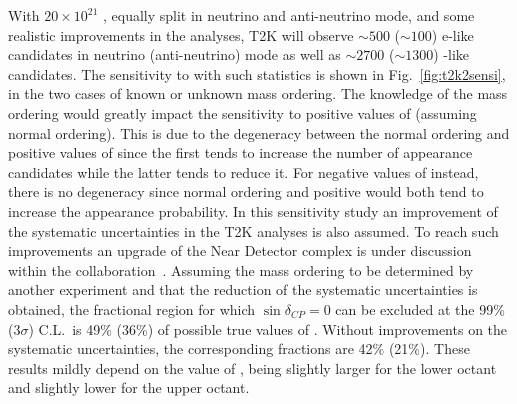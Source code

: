 With $20\times10^{21}$ \pot, equally split in neutrino and anti-neutrino mode, and some realistic improvements in the analyses, T2K will observe $\sim500$ ($\sim100$) e-like candidates in neutrino (anti-neutrino) mode as well as $\sim2700$ ($\sim1300$) \mmu-like candidates. The sensitivity to \dcp with such statistics is shown in Fig.~\ref{fig:t2k2sensi}, in the two cases of known or unknown mass ordering. The knowledge of the mass ordering would greatly impact the sensitivity to positive values of \dcp (assuming normal ordering). This is due to the degeneracy between the normal ordering and positive values of \dcp since the first tends to increase the number of \nue appearance candidates while the latter tends to reduce it. For negative values of \dcp instead, there is no degeneracy since normal ordering and positive \dcp would both tend to increase the \nue appearance probability. In this sensitivity study an improvement of the systematic uncertainties in the T2K analyses is also assumed. To reach such improvements an upgrade of the Near Detector complex is under discussion within the collaboration~\cite{ndupgrade}. Assuming the mass ordering to be determined by another experiment and that the reduction of the systematic uncertainties is obtained, the fractional region for which \(\sin\delta_{CP}=0\) can be excluded at the 99\% (3\(\sigma\)) C.L.\ is 49\% (36\%) of possible true values of \dcp. Without improvements on the systematic uncertainties, the corresponding fractions are 42$\%$ (21$\%$). These results mildly depend on the value of \stt, being slightly larger for the lower octant and slightly lower for the upper octant.

